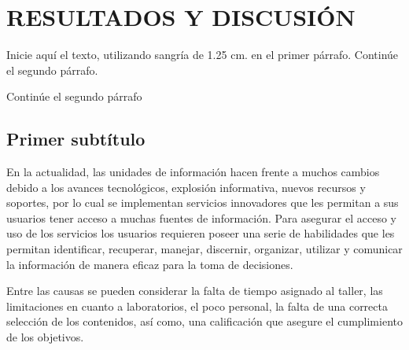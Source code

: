 \chapter{RESULTADOS Y DISCUSI\'ON}

Inicie aquí el texto, utilizando sangría de 1.25 cm. en el primer
párrafo. Continúe el segundo párrafo.

Continúe el segundo párrafo

\section{Primer subtítulo}

En la actualidad, las unidades de información hacen frente a muchos cambios
debido a los avances tecnológicos, explosión informativa, nuevos recursos y
soportes, por lo cual se implementan servicios innovadores que les permitan a
sus usuarios tener acceso a muchas fuentes de información. Para asegurar el
acceso y uso de los servicios los usuarios requieren poseer una serie de
habilidades que les permitan identificar, recuperar, manejar, discernir,
organizar, utilizar y comunicar la información de manera eficaz para la toma de
decisiones.

Entre las causas se pueden considerar la falta de tiempo asignado al taller,
las limitaciones en cuanto a laboratorios, el poco personal, la falta de una
correcta selección de los contenidos, así como, una calificación que asegure el
cumplimiento de los objetivos.

